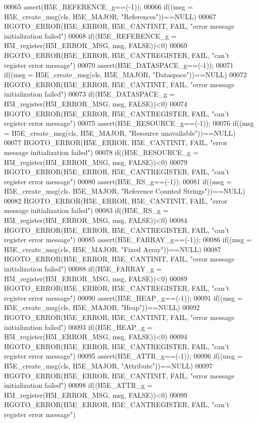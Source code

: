 \begin{DoxyCode}
00065 assert(H5E\_REFERENCE\_g==(-1));
00066 if((msg = H5E\_create\_msg(cls, H5E\_MAJOR, "References"))==NULL)
00067     HGOTO\_ERROR(H5E\_ERROR, H5E\_CANTINIT, FAIL, "error message initialization failed")
00068 if((H5E\_REFERENCE\_g = H5I\_register(H5I\_ERROR\_MSG, msg, FALSE))<0)
00069     HGOTO\_ERROR(H5E\_ERROR, H5E\_CANTREGISTER, FAIL, "can't register error message")
00070 assert(H5E\_DATASPACE\_g==(-1));
00071 if((msg = H5E\_create\_msg(cls, H5E\_MAJOR, "Dataspace"))==NULL)
00072     HGOTO\_ERROR(H5E\_ERROR, H5E\_CANTINIT, FAIL, "error message initialization failed")
00073 if((H5E\_DATASPACE\_g = H5I\_register(H5I\_ERROR\_MSG, msg, FALSE))<0)
00074     HGOTO\_ERROR(H5E\_ERROR, H5E\_CANTREGISTER, FAIL, "can't register error message")
00075 assert(H5E\_RESOURCE\_g==(-1));
00076 if((msg = H5E\_create\_msg(cls, H5E\_MAJOR, "Resource unavailable"))==NULL)
00077     HGOTO\_ERROR(H5E\_ERROR, H5E\_CANTINIT, FAIL, "error message initialization failed")
00078 if((H5E\_RESOURCE\_g = H5I\_register(H5I\_ERROR\_MSG, msg, FALSE))<0)
00079     HGOTO\_ERROR(H5E\_ERROR, H5E\_CANTREGISTER, FAIL, "can't register error message")
00080 assert(H5E\_RS\_g==(-1));
00081 if((msg = H5E\_create\_msg(cls, H5E\_MAJOR, "Reference Counted Strings"))==NULL)
00082     HGOTO\_ERROR(H5E\_ERROR, H5E\_CANTINIT, FAIL, "error message initialization failed")
00083 if((H5E\_RS\_g = H5I\_register(H5I\_ERROR\_MSG, msg, FALSE))<0)
00084     HGOTO\_ERROR(H5E\_ERROR, H5E\_CANTREGISTER, FAIL, "can't register error message")
00085 assert(H5E\_FARRAY\_g==(-1));
00086 if((msg = H5E\_create\_msg(cls, H5E\_MAJOR, "Fixed Array"))==NULL)
00087     HGOTO\_ERROR(H5E\_ERROR, H5E\_CANTINIT, FAIL, "error message initialization failed")
00088 if((H5E\_FARRAY\_g = H5I\_register(H5I\_ERROR\_MSG, msg, FALSE))<0)
00089     HGOTO\_ERROR(H5E\_ERROR, H5E\_CANTREGISTER, FAIL, "can't register error message")
00090 assert(H5E\_HEAP\_g==(-1));
00091 if((msg = H5E\_create\_msg(cls, H5E\_MAJOR, "Heap"))==NULL)
00092     HGOTO\_ERROR(H5E\_ERROR, H5E\_CANTINIT, FAIL, "error message initialization failed")
00093 if((H5E\_HEAP\_g = H5I\_register(H5I\_ERROR\_MSG, msg, FALSE))<0)
00094     HGOTO\_ERROR(H5E\_ERROR, H5E\_CANTREGISTER, FAIL, "can't register error message")
00095 assert(H5E\_ATTR\_g==(-1));
00096 if((msg = H5E\_create\_msg(cls, H5E\_MAJOR, "Attribute"))==NULL)
00097     HGOTO\_ERROR(H5E\_ERROR, H5E\_CANTINIT, FAIL, "error message initialization failed")
00098 if((H5E\_ATTR\_g = H5I\_register(H5I\_ERROR\_MSG, msg, FALSE))<0)
00099     HGOTO\_ERROR(H5E\_ERROR, H5E\_CANTREGISTER, FAIL, "can't register error message")

\end{DoxyCode}
